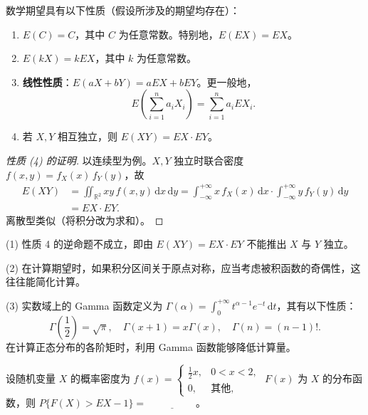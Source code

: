 \documentclass[lang=cn,11pt]{elegantbook}
\begin{document}
\begin{property}\label{prop:expectation}
数学期望具有以下性质（假设所涉及的期望均存在）：
\begin{enumerate}
    \item \(E(C) = C\)，其中 \(C\) 为任意常数。特别地，\(E(EX) = EX\)。
    \item \(E(kX) = kEX\)，其中 \(k\) 为任意常数。
    \item \textbf{线性性质}：\(E(aX + bY) = aEX + bEY\)。更一般地，
    \[
    E\!\left(\sum_{i=1}^{n} a_i X_i\right) = \sum_{i=1}^{n} a_i EX_i.
    \]
    \item 若 \(X, Y\) 相互独立，则 \(E(XY) = EX \cdot EY\)。
\end{enumerate}
\end{property}
\begin{proof}[性质 (4) 的证明]
以连续型为例。\(X, Y\) 独立时联合密度 \(f(x,y) = f_X(x)\,f_Y(y)\)，故
\begin{align*}
E(XY) &= \iint_{\mathbb{R}^2} xy\,f(x,y)\,\mathrm{d}x\,\mathrm{d}y
= \int_{-\infty}^{+\infty} x\,f_X(x)\,\mathrm{d}x \cdot \int_{-\infty}^{+\infty} y\,f_Y(y)\,\mathrm{d}y \\
&= EX \cdot EY.
\end{align*}
离散型类似（将积分改为求和）。
\end{proof}

\begin{note}
(1) 性质 4 的逆命题不成立，即由 \(E(XY) = EX \cdot EY\) 不能推出 \(X\) 与 \(Y\) 独立。\par
(2) 在计算期望时，如果积分区间关于原点对称，应当考虑被积函数的奇偶性，这往往能简化计算。\par
(3) 实数域上的 Gamma 函数定义为 \(\Gamma(\alpha) = \int_0^{+\infty} t^{\alpha-1}e^{-t}\,\mathrm{d}t\)，其有以下性质：
\[
\Gamma\!\left(\frac{1}{2}\right) = \sqrt{\pi},\quad \Gamma(x+1) = x\Gamma(x),\quad \Gamma(n) = (n-1)!.
\]
在计算正态分布的各阶矩时，利用 Gamma 函数能够降低计算量。
\end{note}


\begin{exercise}\label{exer:4-6-fx}
设随机变量 \(X\) 的概率密度为 \(f(x) = \begin{cases} \frac12x, & 0 < x < 2, \\ 0, & \text{其他}, \end{cases}\) \(F(x)\) 为 \(X\) 的分布函数，则 \(P\{F(X) > EX - 1\} =\,\underline{\hspace{2cm}}\)。
\end{exercise}
\end{document}
